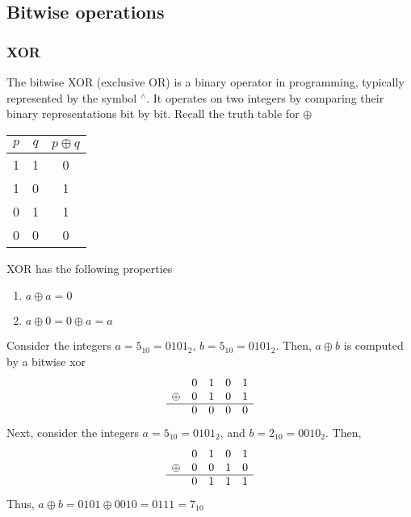 \documentclass{report}
\begin{document}
    \subsection{Bitwise operations}
    \bigbreak \noindent 
    \subsubsection{XOR}
    \bigbreak \noindent 
    The bitwise XOR (exclusive OR) is a binary operator in programming, typically represented by the symbol $^{\land}$. It operates on two integers by comparing their binary representations bit by bit.
    \bigbreak \noindent 
    Recall the truth table for $\oplus$ 
    \begin{center}
        \begin{tabular}{c|c|c}
            $p$ & $q$ & $p\oplus q$ \\
            \hline
            1 & 1 & 0 \\
            1 & 0 & 1 \\
            0 & 1 & 1 \\
            0 & 0 & 0
        \end{tabular}
    \end{center}
        XOR has the following properties
        \begin{enumerate}
            \item $a\oplus a=0$
            \item $a \oplus 0 = 0 \oplus a = a$
        \end{enumerate}
        Consider the integers $a = 5_{10} = 0101_{2}$, $b=5_{10} = 0101_{2}$. Then, $a\oplus b$ is computed by a bitwise xor
        \bigbreak \noindent 
        \begin{align*}
            \begin{array}{ccccc}
                &0&1&0&1 \\
                \oplus &0&1&0&1 \\
                \hline
                       &0&0&0&0
            \end{array}
        \end{align*}
        Next, consider the integers $a = 5_{10} = 0101_{2}$, and $b=2_{10} = 0010_{2}$. Then,
        \begin{align*}
            \begin{array}{ccccc}
               &0&1&0&1 \\
                \oplus & 0&0&1&0 \\
                \hline
                       &0&1&1&1
            \end{array}
        \end{align*}
        Thus, $a\oplus b  = 0101 \oplus 0010 = 0111 = 7_{10}$
\end{document}
